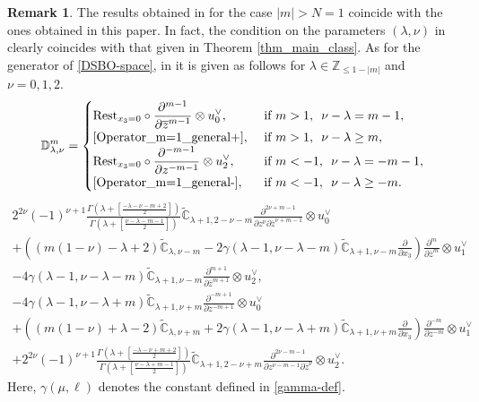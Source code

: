 \documentclass[12pt, pdflatex, a4paper]{article}
\theoremstyle{plain}
\theoremstyle{definition}
\newtheorem{rem}[thm]{Remark}
\def\C{{\mathbb C}}
\def\D{\mathbb{D}}
\def\Rest{\text{\normalfont{Rest}}}
\def\Z{{\mathbb Z}}
\begin{document}
\begin{rem}
The results obtained in \cite{Per-Val23} for the case $|m| > N = 1$ coincide with the ones obtained in this paper. In fact, the condition on the parameters $(\lambda, \nu)$ in \cite[Thm. 1.2]{Per-Val23} clearly coincides with that given in Theorem \ref{thm_main_class}. As for the generator of \eqref{DSBO-space}, in \cite{Per-Val23} it is given as follows for $\lambda \in \Z_{\leq 1-|m|}$ and $\nu = 0, 1, 2$.
\begin{equation}
\D_{\lambda, \nu}^{m} = 
\begin{cases}
{\displaystyle{\Rest_{x_3 = 0} \circ \frac{\partial^{m-1}}{\partial \overline{z}^{m-1}} \otimes u_0^\vee}}, &\text{ if } m > 1, \enspace \nu-\lambda = m-1,\\
\eqref{Operator_m=1_general+}, & \text{ if } m > 1, \enspace \nu - \lambda \geq m,\\
{\displaystyle{\Rest_{x_3 = 0} \circ \frac{\partial^{-m-1}}{\partial z^{-m-1}} \otimes u_2^\vee}}, &\text{ if } m < -1, \enspace \nu-\lambda = -m-1,\\
\eqref{Operator_m=1_general-}, & \text{ if } m < -1, \enspace \nu - \lambda \geq -m.
\end{cases}
\end{equation}
\begin{multline}\label{Operator_m=1_general+}
2^{2\nu}(-1)^{\nu+1}\frac{\Gamma\left(\lambda + \left[\frac{-\lambda-\nu - m+2}{2}\right]\right)}{\Gamma(\lambda + \left[\frac{\nu - \lambda - m -1}{2}\right])}\widetilde{\C}_{\lambda+1, 2-\nu-m}\frac{\partial^{2\nu+m-1}}{\partial z^\nu \partial \overline{z}^{\nu+m-1}} \otimes u_0^\vee\\
+\left((m(1-\nu)-\lambda+2)\widetilde{\C}_{\lambda, \nu-m} -2\gamma(\lambda-1, \nu-\lambda-m)\widetilde{\C}_{\lambda+1, \nu-m}\frac{\partial}{\partial x_3}\right)\frac{\partial^m}{\partial \overline{z}^m} \otimes u_1^\vee\\
-4\gamma(\lambda-1, \nu-\lambda-m)\widetilde{\C}_{\lambda+1, \nu-m}\frac{\partial^{m+1}}{\partial \overline{z}^{m+1}} \otimes u_2^\vee,
\end{multline}
\begin{multline}\label{Operator_m=1_general-}
-4\gamma(\lambda-1, \nu-\lambda+m)\widetilde{\C}_{\lambda+1, \nu+m}\frac{\partial^{-m+1}}{\partial z^{-m+1}} \otimes u_0^\vee\\
+\left((m(1-\nu)+\lambda-2)\widetilde{\C}_{\lambda, \nu+m} +2\gamma(\lambda-1, \nu-\lambda+m)\widetilde{\C}_{\lambda+1, \nu+m}\frac{\partial}{\partial x_3}\right)\frac{\partial^{-m}}{\partial z^{-m}} \otimes u_1^\vee\\
+ 2^{2\nu}(-1)^{\nu+1}\frac{\Gamma\left(\lambda + \left[\frac{-\lambda-\nu + m+2}{2}\right]\right)}{\Gamma(\lambda + \left[\frac{\nu - \lambda + m -1}{2}\right])}\widetilde{\C}_{\lambda+1, 2-\nu+m}\frac{\partial^{2\nu-m-1}}{\partial z^{\nu-m-1} \partial \overline{z}^\nu}  \otimes u_2^\vee.
\end{multline}
Here, $\gamma(\mu, \ell)$ denotes the constant defined in \eqref{gamma-def}.


\end{rem}
\end{document}

